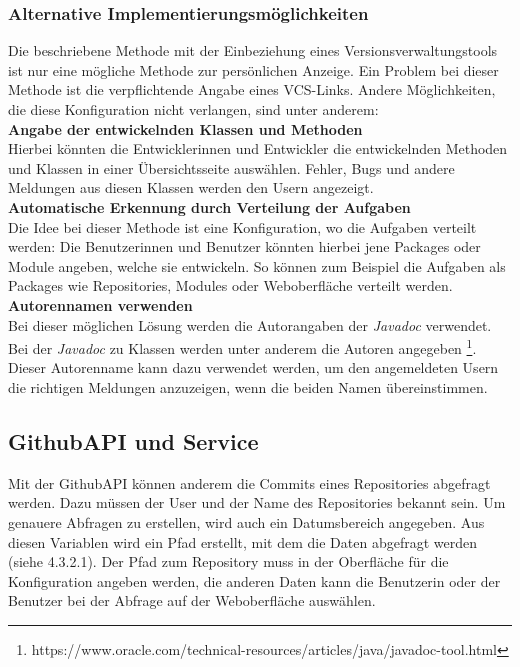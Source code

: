 \subsubsection{Alternative Implementierungsmöglichkeiten}
Die beschriebene Methode mit der Einbeziehung eines Versionsverwaltungstools ist nur eine mögliche Methode zur persönlichen Anzeige. Ein Problem bei dieser Methode ist die verpflichtende Angabe eines VCS-Links. Andere Möglichkeiten, die diese Konfiguration nicht verlangen, sind unter anderem: \\
\textbf{Angabe der entwickelnden Klassen und Methoden} \\
Hierbei könnten die Entwicklerinnen und Entwickler die entwickelnden Methoden und Klassen in einer Übersichtsseite auswählen. Fehler, Bugs und andere Meldungen aus diesen Klassen werden den Usern angezeigt.\\
\textbf{Automatische Erkennung durch Verteilung der Aufgaben} \\
Die Idee bei dieser Methode ist eine Konfiguration, wo die Aufgaben verteilt werden: Die Benutzerinnen und Benutzer könnten hierbei jene Packages oder Module angeben, welche sie entwickeln. So können zum Beispiel die Aufgaben als Packages wie Repositories, Modules oder Weboberfläche verteilt werden. \\
\textbf{Autorennamen verwenden} \\
Bei dieser möglichen Lösung werden die Autorangaben der \textit{Javadoc} verwendet. Bei der \textit{Javadoc} zu Klassen werden unter anderem die Autoren angegeben \footnote{https://www.oracle.com/technical-resources/articles/java/javadoc-tool.html}. Dieser Autorenname kann dazu verwendet werden, um den angemeldeten Usern die richtigen Meldungen anzuzeigen, wenn die beiden Namen übereinstimmen.
\subsection{GithubAPI und Service}
Mit der GithubAPI können anderem die Commits eines Repositories abgefragt werden. Dazu müssen der User und der Name des Repositories bekannt sein. Um genauere Abfragen zu erstellen, wird auch ein Datumsbereich angegeben. Aus diesen Variablen wird ein Pfad erstellt, mit dem die Daten abgefragt werden (siehe 4.3.2.1). Der Pfad zum Repository muss in der Oberfläche für die Konfiguration angeben werden, die anderen Daten kann die Benutzerin oder der Benutzer bei der Abfrage auf der Weboberfläche auswählen. 

